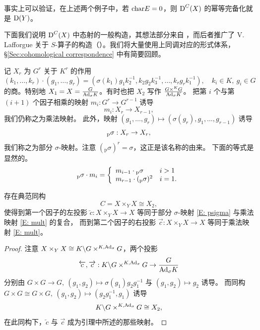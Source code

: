 \begin{rmk}
\label{R:springer}
事实上可以验证，在上述两个例子中，若 ${\operatorname{char}} E=0$，则 $\operatorname{D}^C(X)$ 的幂等完备化就是 $\operatorname{D}(Y)$。
\end{rmk}

下面我们说明 $\operatorname{D}^{C}(X)$ 中态射的一般构造，其想法部分来自 \cite[\S 6]{XZ}，而后者推广了 V. Lafforgue 关于 $S$-算子的构造（\cite[\S 6]{La}）。我们将大量使用上同调对应的形式体系，\S \ref{Sec:cohomological correspondence} 中有简要回顾。

记 $X_r$ 为 $G^r$ 关于 $K^r$ 的作用
\begin{equation*}
(k_1,\ldots,k_r)\cdot (g_1,\ldots,g_r)=(\sigma(k_1)g_1k_2^{-1},k_2g_2k_3^{-1},\ldots,k_rg_rk_1^{-1}),\quad k_i\in K, \ g_i\in G
\end{equation*}
的商。特别地 $X_1=X=\frac{G}{{\operatorname{Ad}}_\sigma K}$。有时也把 $X_2$ 写作 $\frac{G\times^K G}{{\operatorname{Ad}}_\sigma K}$。
把第 $i$ 个与第 $(i+1)$ 个因子相乘的映射 $m_i:G^r\to G^{r-1}$ 诱导
\begin{equation}
\label{E: mult}
m_i: X_r\to X_{r-1},
\end{equation}
我们仍称之为乘法映射。
此外，映射 $(g_1,\ldots, g_r)\mapsto (\sigma(g_r),g_1,\ldots, g_{r-1})$ 诱导
\begin{equation}
\label{E: psigma}
{_\mathrm{p}\sigma}: X_r\to X_r,
\end{equation}
我们称之为部分 $\sigma$-映射。注意 $(_\mathrm{p}\sigma)^r=\sigma$，这正是该名称的由来。
下面的等式是显然的。
\begin{equation*}
\label{E:mult vs pFr}
{_\mathrm{p}\sigma} \cdot m_i=\left\{ \begin{array}{ll}m_{i-1}\cdot{_\mathrm{p}\sigma} &  i>1\\ m_{r-1}\cdot ({_\mathrm{p}\sigma})^2 & i=1. \end{array}\right.
\end{equation*}

\begin{lem}
\label{L: decom of C}
存在典范同构
\[C=X\times_YX\cong X_2,\]
使得到第一个因子的左投影 $\overleftarrow{c}:X\times_YX\to X$ 等同于部分 $\sigma$-映射 \eqref{E: psigma} 与乘法映射 \eqref{E: mult} 的复合，
而到第二个因子的右投影 $\overrightarrow{c}:X\times_YX\to X$ 等同于乘法映射 \eqref{E: mult}。
\end{lem}
\begin{proof}
注意 $X\times_YX\cong K\backslash G\times^{K, {\operatorname{Ad}}_\sigma}G$，两个投影
$$\overleftarrow{c},\overrightarrow{c}:  K\backslash G\times^{K, {\operatorname{Ad}}_\sigma}G\to \frac{G}{{\operatorname{Ad}}_\sigma K}$$
分别由 $G\times G\to G, \ (g_1,g_2)\mapsto \sigma(g_1)g_2g_1^{-1}$ 与 $(g_1,g_2)\mapsto g_2$ 诱导。
而同构 $G\times G\cong G\times G,\ (g_1,g_2)\mapsto (g_2g_1^{-1}, g_1)$ 诱导
\[
 K\backslash G\times^{K, {\operatorname{Ad}}_\sigma}G \cong  X_2,\]
在此同构下，$\overleftarrow{c}$ 与 $\overrightarrow{c}$ 成为引理中所述的那些映射。
\end{proof}

